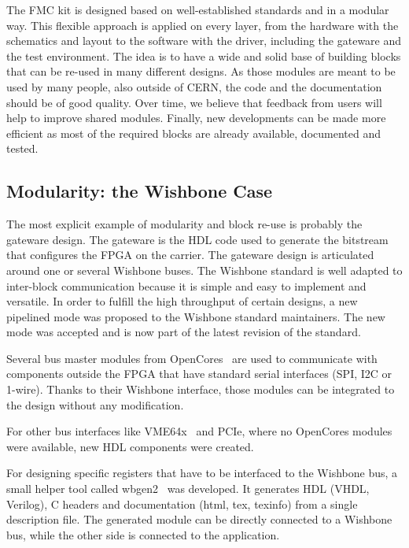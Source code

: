 \documentclass{JAC2003}
\begin{document}
The FMC kit is designed based on well-established standards and in a modular way.
This flexible approach is applied on every layer, from the hardware with the schematics and layout to the software with the driver, including the gateware and the test environment.
The idea is to have a wide and solid base of building blocks that can be re-used in many different designs.
As those modules are meant to be used by many people, also outside of CERN, the code and the documentation should be of good quality.
Over time, we believe that feedback from users will help to improve shared modules.
Finally, new developments can be made more efficient as most of the required blocks are already available, documented and tested.

\subsection{Modularity: the Wishbone Case}
The most explicit example of modularity and block re-use is probably the gateware design.
The gateware is the HDL code used to generate the bitstream that configures the FPGA on the carrier.
The gateware design is articulated around one or several Wishbone buses.
The Wishbone standard is well adapted to inter-block communication because it is simple and easy to implement and versatile.
In order to fulfill the high throughput of certain designs, a new pipelined mode was proposed to the Wishbone standard maintainers. The new mode was accepted and is now part of the latest revision of the standard.

Several bus master modules from OpenCores~\cite{opencores} are used to communicate with components outside the FPGA that have standard serial interfaces (SPI, I2C or 1-wire).
Thanks to their Wishbone interface, those modules can be integrated to the design without any modification.

For other bus interfaces like VME64x~\cite{vme} and PCIe, where no OpenCores modules were available, new HDL components were created.

For designing specific registers that have to be interfaced to the Wishbone bus, a small helper tool called wbgen2~\cite{wbgen2} was developed.
It generates HDL (VHDL, Verilog), C headers and documentation (html, tex, texinfo) from a single description file.
The generated module can be directly connected to a Wishbone bus, while the other side is connected to the application.
\end{document}
